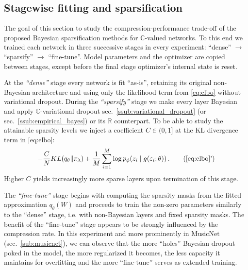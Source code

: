 \documentclass[a4paper,10pt]{article}
\newcommand{\real}{\mathbb{R}}
\newcommand{\cplx}{\mathbb{C}}
\begin{document}
\subsection{Stagewise fitting and sparsification} %
\label{sub:fitting_and_sparsification}

The goal of this section to study the compression-performance trade-off of the proposed Bayesian
sparsification methods for $\cplx$-valued networks. To this end we trained each network in
three successive stages in every experiment: ``dense'' $\to$ ``sparsify'' $\to$ ``fine-tune''.
Model parameters and the optimizer are copied between stages, except before the final stage
optimizer's internal state is reset.

At the \textit{``dense''} stage every network is fit ``as-is'', retaining its original
non-Bayesian architecture and using only the likelihood term from \eqref{eq:elbo} without
variational dropout.
%
During the \textit{``sparsify''} stage we make every layer Bayesian and apply $\cplx$-variational
dropout sec.~\ref{ssub:variational_dropout} (or sec.~\ref{ssub:empirical_bayes}) or its $\real$
counterpart. To be able to study the attainable sparsity levels we inject a coefficient $
  C \in (0, 1]
$ at the KL divergence term in \eqref{eq:elbo}:
\begin{equation}  \label{eq:elbo_with_coef}
    - \frac{C}N KL(q_{\theta} \| \pi_{\lambda})
    + \frac1{M} \sum_{i=1}^M
        \log p_{\phi}(z_i \mid g(\varepsilon_i; \theta))
    \,. \tag{\ref{eq:elbo}'}
\end{equation}
Higher $C$ yields increasingly more sparse layers upon termination of this stage.

The \textit{``fine-tune''} stage begins with computing the sparsity masks from the fitted
approximation $q_\theta(W)$ and proceeds to train the non-zero parameters similarly to
the ``dense'' stage, i.e. with non-Bayesian layers and fixed sparsity masks. 
%
The benefit of the ``fine-tune'' stage appears to be strongly influenced by the compression
rate. In this experiment and more prominently in MusicNet (sec.~\ref{sub:musicnet}), we
can observe that the more ``holes'' Bayesian dropout poked in the model, the more regularized
it becomes, the less capacity it maintains for overfitting and the more ``fine-tune'' serves
as extended training.
\end{document}
